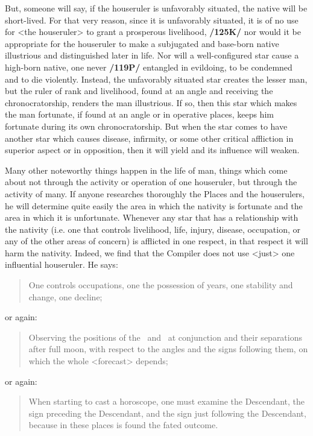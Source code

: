 But, someone will say, if the houseruler is unfavorably situated, the native will be short-lived. For that very reason, since it is unfavorably situated, it is of no use for <the houseruler> to grant a prosperous livelihood, \textbf{/125K/} nor would it be appropriate for the houseruler to make a subjugated and base-born native illustrious and distinguished later in life. Nor will a well-configured star cause a high-born native, one never \textbf{/119P/} entangled in evildoing, to be condemned and to die violently. Instead, the unfavorably situated star creates the lesser man, but the ruler of rank and livelihood, found at an angle and receiving the chronocratorship, renders the man illustrious. If so, then this star which makes the man fortunate, if found at an angle or in operative places, keeps him fortunate during its own chronocratorship. But when the star comes to have another star which causes disease, infirmity, or some other critical affliction in superior aspect or in opposition, then it will yield and its influence will weaken. 

Many other noteworthy things happen in the life of man, things which come about not through the activity or operation of one houseruler, but through the activity of many. If anyone researches thoroughly the Places and the houserulers, he will determine quite easily the area in which the nativity is fortunate and the area in which it is unfortunate. Whenever any star that has a relationship with the nativity (i.e. one that controls livelihood, life, injury, disease, occupation, or any of the other areas of concern) is afflicted in one respect, in that respect it will harm the nativity. Indeed, we find that the Compiler does not use <just> one influential houseruler. He says: \begin{quote}One controls occupations, one the possession of years, one stability and change, one decline; \end{quote}
or again:
\begin{quote}Observing the positions of the \Sun\, and \Moon\, at conjunction and their separations after full moon, with respect to the angles and the signs following them, on which the whole <forecast> depends;\end{quote}
or again:
\begin{quote}When starting to cast a horoscope, one must examine the Descendant, the sign preceding the Descendant,
and the sign just following the Descendant, because in these places is found the fated outcome.\end{quote}

